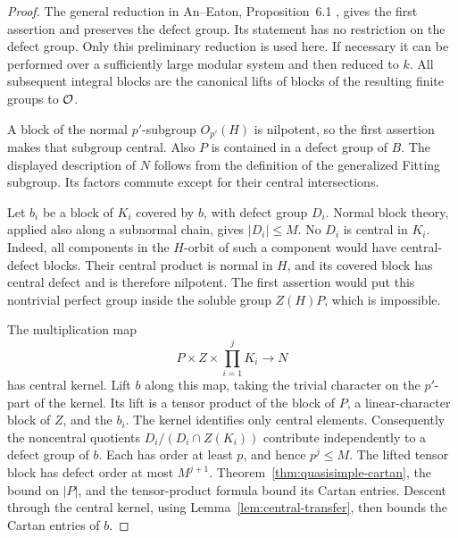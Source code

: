 \begin{proof}
The general reduction in An--Eaton, Proposition~6.1
\cite{AnEaton}, gives the first assertion and preserves the defect
group.  Its statement has no restriction on the defect group.  Only
this preliminary reduction is used here.  If necessary it can be
performed over a sufficiently large modular system and then reduced
to $k$.  All subsequent integral blocks are the canonical lifts of
blocks of the resulting finite groups to $\mathcal O$.

A block of the normal $p'$-subgroup $O_{p'}(H)$ is nilpotent, so the
first assertion makes that subgroup central.  Also $P$ is contained
in a defect group of $B$.  The displayed description of $N$ follows
from the definition of the generalized Fitting subgroup.  Its factors
commute except for their central intersections.

Let $b_i$ be a block of $K_i$ covered by $b$, with defect group $D_i$.
Normal block theory, applied also along a subnormal chain, gives
$|D_i|\leq M$.  No $D_i$ is central in $K_i$.  Indeed, all components
in the $H$-orbit of such a component would have central-defect blocks.
Their central product is normal in $H$, and its covered block has
central defect and is therefore nilpotent.  The first assertion would
put this nontrivial perfect group inside the soluble group $Z(H)P$,
which is impossible.

The multiplication map
\[
 P\times Z\times\prod_{i=1}^j K_i\longrightarrow N
\]
has central kernel.  Lift $b$ along this map, taking the trivial
character on the $p'$-part of the kernel.  Its lift is a tensor product
of the block of $P$, a linear-character block of $Z$, and the $b_i$.
The kernel identifies only central elements.  Consequently the
noncentral quotients $D_i/(D_i\cap Z(K_i))$ contribute independently
to a defect group of $b$.  Each has order at least $p$, and hence
$p^j\leq M$.  The lifted tensor block has defect order at most
$M^{j+1}$.  Theorem~\ref{thm:quasisimple-cartan}, the bound on $|P|$,
and the tensor-product formula bound its Cartan entries.  Descent
through the central kernel, using Lemma~\ref{lem:central-transfer},
then bounds the Cartan entries of $b$.


\end{proof}
